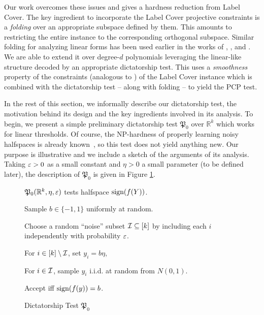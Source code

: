 Our work overcomes these issues and gives a hardness reduction from
Label Cover. The key ingredient to incorporate the Label Cover
projective constraints is a \emph{folding} over an appropriate
subspace defined by them. This amounts to restricting the entire instance
to the corresponding orthogonal subspace.  Similar folding for analyzing linear forms
has been used earlier in the works of \cite{KS11},
\cite{FGRW12}, and \cite{GRSW}. We are able to extend it over
degree-$d$ polynomials leveraging the linear-like structure decoded by
an appropriate dictatorship test. This uses a \emph{smoothness} property of 
the constraints (analogous to \cite{KS11,FGRW12,GRSW})  
of the Label Cover instance which is combined with the 
dictatorship test -- along with folding --
to yield the PCP test. 






In the rest of this section, we informally describe our dictatorship
test, the motivation behind its design and the key ingredients
involved in its analysis. To begin, we present a simple preliminary
dictatorship test $\mathfrak{P}_0$ over $\mathbb{R}^{k}$ which works for linear thresholds. 
Of course, the NP-hardness of properly learning noisy halfspaces is
already known~\citep{FGKP09,GR09}, so this test does not yield anything
new.
Our purpose is illustrative and we include a sketch
of the arguments of its analysis. 
Taking $\varepsilon > 0$ as a
small constant and  $\eta > 0$ a small parameter (to be defined
later), the description of $\mathfrak{P}_0$ is given in Figure \ref{fig:pcptest-0-intro}.
\begin{figure}
\begin{mdframed}
\begin{center} $\mathfrak{P}_0(\mathbb{R}^k, \eta, \varepsilon)$ tests halfspace
$\textnormal{sign}(f(Y))$. \end{center}
\begin{enumerate*}

\item Sample $b \in \{-1,1\}$ uniformly at random.

\item Choose a random ``noise'' subset $\mathcal{I} \subseteq [k]$ by
including each $i$ independently with probability $\varepsilon$.

\item For $i \in [k]\setminus\mathcal{I}$,  
set
$y_i = b\eta$,

\item For $i \in \mathcal{I}$, sample $y_i$ 
i.i.d. at random from $N(0,1)$.


\item Accept iff $\textnormal{sign}(f(y)) =  b$.
\end{enumerate*}
\end{mdframed}
\caption{Dictatorship Test $\mathfrak{P}_0$}
\label{fig:pcptest-0-intro}
\end{figure}

